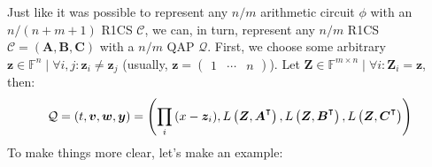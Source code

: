 \noindent Just like it was possible to represent any \(n/m\) arithmetic circuit \(\phi \) with an
\(n/(n+m+1)\) R1CS \(\mathcal{C}\), we can, in turn, represent any \(n/m\) R1CS
\(\mathcal{C} = \left(\bm{A}, \bm{B}, \bm{C}\right)\) with a \(n/m\) QAP \(\mathcal{Q}\).
First, we choose some arbitrary
\(\bm{z} \in \mathbb{F}^n \mid \forall i,j\colon \bm{z}_i \neq \bm{z}_j\)
(usually, \(\bm{z} = \begin{pmatrix}1 & \cdots & n\end{pmatrix}\)).
Let \(\bm{Z} \in \mathbb{F}^{m \times n} \mid \forall i\colon \bm{Z}_i = \bm{z}\), then:
\[\mathcal{Q} = \left(t, \bm{v}, \bm{w}, \bm{y}\right) = \left(
	\prod_{i}{\left(x - \bm{z}_i\right)},
	L\left(\bm{Z}, \bm{A}^{\transpose}\right),
	L\left(\bm{Z}, \bm{B}^{\transpose}\right),
	L\left(\bm{Z}, \bm{C}^{\transpose}\right)
	\right)
\]
To make things more clear, let's make an example:
